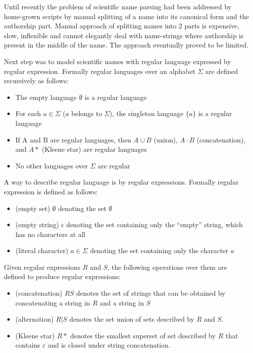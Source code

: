 \documentclass{bmcart}
\begin{document}
Until recently the problem of scientific name parsing had been addressed by
home-grown scripts by manual splitting of a name into its canonical form and
the authorship part. Manual approach of splitting names into 2 parts is
expensive, slow, inflexible and cannot elegantly deal with name-strings where
authorship is present in the middle of the name. The approach eventually
proved to be limited.

Next step was to model scientific names with regular language expressed by
regular expression. Formally regular languages over an alphabet $\Sigma$ are
defined recursively as follows:

\begin{itemize}
  \item The empty language $\emptyset$ is a regular language
  \item For each $a \in \Sigma$ ($a$ belongs to $\Sigma$), the singleton
  language $\{a\}$ is a regular language
  \item If A and B are regular languages, then $A \cup B$ (union), $A \cdot B$
  (concatenation), and $A*$ (Kleene star) are regular languages
  \item No other languages over $\Sigma$ are regular
\end{itemize}

A way to describe regular language is by regular expressions. Formally regular
expression is defined as follows:

\begin{itemize}
  \item (empty set) $\emptyset$ denoting the set $\emptyset$
  \item (empty string) $\epsilon$ denoting the set containing only the
  ``empty'' string, which has no characters at all
  \item (literal character) $a \in \Sigma$ denoting the set containing only the
  character $a$
\end{itemize}

Given regular expressions $R$ and $S$, the following operations over them are
defined to produce regular expressions:

\begin{itemize}
  \item (concatenation) $RS$ denotes the set of strings that can be obtained
  by concatenating a string in $R$ and a string in $S$
  \item (alternation) $R \vert S$ denotes the set union of sets described by
  $R$ and $S$.
  \item (Kleene star) $R*$ denotes the smallest superset of set described by
  $R$ that contains $\varepsilon$ and is closed under string concatenation.
\end{itemize}
\end{document}
